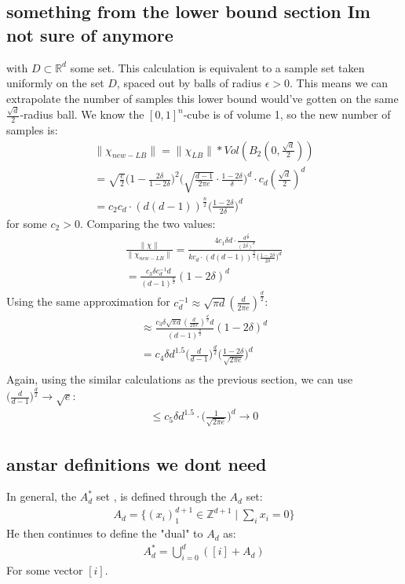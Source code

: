 \subsection{something from the lower bound section Im not sure of anymore}
with $D\subset \mathbb{R}^d$ some set. This calculation is equivalent to a sample set taken uniformly on the set $D$, spaced out by balls of radius $\epsilon>0$.  This means we can extrapolate the number of samples this lower bound would've gotten on the same $\frac{\sqrt{d}}{2}$-radius ball. We know the $[0,1]^n$-cube is of volume 1, so the new number of samples is:
\begin{align*}
    \|\chi_{new-LB}\|=\|\chi_{LB}\|*Vol(B_2(0,\frac{\sqrt{d}}{2})) \\
    =\sqrt{\frac{e}{2}}\Big(1-\frac{2\delta}{1-2\delta}\Big)^2\Big(\sqrt{\frac{d-1}{2\pi e}}\cdot \frac{1-2\delta}{\delta}\Big)^d \cdot c_d(\frac{\sqrt{d}}{2})^d \\
    =c_2c_d\cdot (d(d-1))^{\frac{n}{2}}\Big(\frac{1-2\delta}{2\delta}\Big)^d
\end{align*}
for some $c_2>0$. Comparing the two values:
\begin{align*}
    \frac{\|\chi\|}{\|\chi_{new-LB}\|} = \frac{4c_1\delta d\cdot\frac{d^{\frac{d}{2}}}{(2\delta)^d}}{kc_d\cdot (d(d-1))^{\frac{n}{2}}\Big(\frac{1-2\delta}{2\delta}\Big)^d} \\
    =\frac{c_3\delta c_d^{-1}d}{(d-1)^{\frac{n}{2}}}(1-2\delta)^d
\end{align*}
Using the same approximation for $c_d^{-1}\approx\sqrt{\pi d}(\frac{d}{2\pi e})^{\frac{d}{2}}$:
\begin{align*}
    \approx\frac{c_3\delta \sqrt{\pi d}(\frac{d}{2\pi e})^{\frac{d}{2}}d}{(d-1)^{\frac{n}{2}}}(1-2\delta)^d \\
    =c_4\delta d^{1.5}\Big(\frac{d}{d-1}\Big)^{\frac{d}{2}}\Big(\frac{1-2\delta}{\sqrt{2\pi e}}\Big)^d \\
\end{align*}
Again, using the similar calculations as the previous section, we can use $\Big(\frac{d}{d-1}\Big)^\frac{d}{2}\rightarrow \sqrt{e}$:
\begin{align*}
    \leq c_5\delta d^{1.5}\cdot\Big(\frac{1}{\sqrt{2\pi e}}\Big)^d\rightarrow 0
\end{align*}

\subsection{anstar definitions we dont need}
In general, the $A_d^*$ set , is defined through the $A_d$ set:
\begin{align}
    A_d=\{(x_i)_1^{d+1} \in \mathbb{Z}^{d+1} \mid \sum_i x_i = 0\}
\end{align}
He then continues to define the "dual" to $A_d$ as:
\begin{align}
    A_d^*=\bigcup_{i=0}^d ([i]+A_d)
\end{align}
For some vector $[i]$. 

